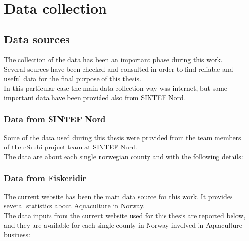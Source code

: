 
\newpage
\chapter{Data collection}
\section{Data sources}
The collection of the data has been an important phase during this work. \\
Several sources have been checked and consulted in order to find reliable and useful data for the final purpose of this thesis.\\
In this particular case the main data collection way was internet, but some important data have been provided also from SINTEF Nord.


\subsection{Data from SINTEF Nord}
Some of the data used during this thesis were provided from the team members of the eSushi project team at SINTEF Nord. \\
The data are about each single norwegian county and with the following details:\\





\newpage
 
\subsection{Data from Fiskeridir} 
The current website has been the main data source for this work. It provides several statistics about Aquaculture in Norway.\\
The data inputs from the current website used for this thesis are reported below, and they are available for each single county in Norway involved in Aquaculture business:

